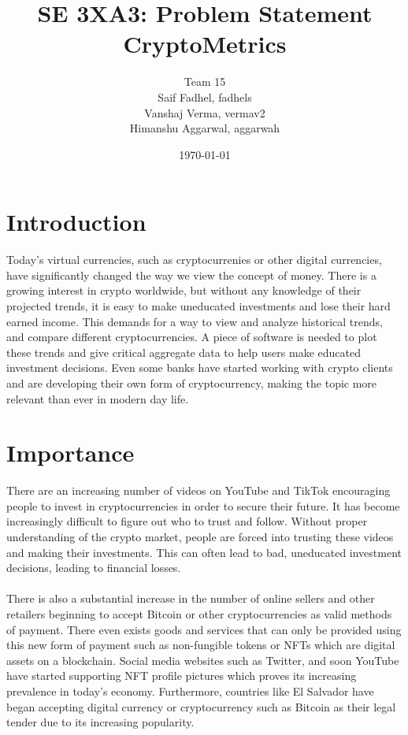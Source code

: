 \documentclass[12pt,fleqn]{article}
\title{SE 3XA3: Problem Statement\\CryptoMetrics}
\author{Team 15
		\\ Saif Fadhel, fadhels
		\\ Vanshaj Verma, vermav2
		\\ Himanshu Aggarwal, aggarwah
}
\date{\today}
\begin{document}
\maketitle
\thispagestyle{empty}
\pagebreak

\section{Introduction}
Today's virtual currencies, such as cryptocurrenies or other digital currencies, have significantly changed the way we view the concept of money. There is a growing interest in crypto worldwide, but without any knowledge of their projected trends, it is easy to make uneducated investments and lose their hard earned income. This demands for a way to view and analyze historical trends, and compare different cryptocurrencies. A piece of software is needed to plot these trends and give critical aggregate data to help users make educated investment decisions. Even some banks have started working with crypto clients and are developing their own form of cryptocurrency, making the topic more relevant than ever in modern day life.

\section{Importance}
There are an increasing number of videos on YouTube and TikTok encouraging people to invest in cryptocurrencies in order to secure their future. It has become increasingly difficult to figure out who to trust and follow. Without proper understanding of the crypto market, people are forced into trusting these videos and making their investments. This can often lead to bad, uneducated investment decisions, leading to financial losses.\\\\
There is also a substantial increase in the number of online sellers and other retailers beginning to accept Bitcoin or other cryptocurrencies as valid methods of payment. There even exists goods and services that can only be provided using this new form of payment such as non-fungible tokens or NFTs which are digital assets on a blockchain. Social media websites such as Twitter, and soon YouTube have started supporting NFT profile pictures which proves its increasing prevalence in today's economy. Furthermore, countries like El Salvador have began accepting digital currency or cryptocurrency such as Bitcoin as their legal tender due to its increasing popularity.
\end{document}
